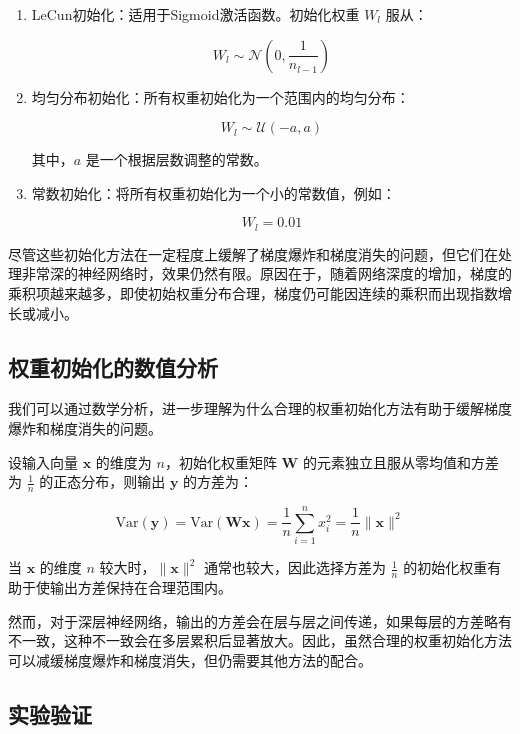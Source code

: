 \begin{enumerate}


  \item LeCun初始化：适用于Sigmoid激活函数。初始化权重 \( W_l \) 服从：

  \[ W_l \sim \mathcal{N}\left(0, \frac{1}{n_{l-1}}\right) \]

  \item 均匀分布初始化：所有权重初始化为一个范围内的均匀分布：

  \[ W_l \sim \mathcal{U}(-a, a) \]

  其中，\( a \) 是一个根据层数调整的常数。

  \item 常数初始化：将所有权重初始化为一个小的常数值，例如：

  \[ W_l = 0.01 \]

\end{enumerate}

尽管这些初始化方法在一定程度上缓解了梯度爆炸和梯度消失的问题，但它们在处理非常深的神经网络时，效果仍然有限。原因在于，随着网络深度的增加，梯度的乘积项越来越多，即使初始权重分布合理，梯度仍可能因连续的乘积而出现指数增长或减小。

\subsection{权重初始化的数值分析}

我们可以通过数学分析，进一步理解为什么合理的权重初始化方法有助于缓解梯度爆炸和梯度消失的问题。

设输入向量 \( \mathbf{x} \) 的维度为 \( n \)，初始化权重矩阵 \( \mathbf{W} \) 的元素独立且服从零均值和方差为 \( \frac{1}{n} \) 的正态分布，则输出 \( \mathbf{y} \) 的方差为：

\[ \text{Var}(\mathbf{y}) = \text{Var}(\mathbf{W}\mathbf{x}) = \frac{1}{n} \sum_{i=1}^n x_i^2 = \frac{1}{n} \|\mathbf{x}\|^2 \]

当 \(\mathbf{x}\) 的维度 \( n \) 较大时，\(\|\mathbf{x}\|^2\) 通常也较大，因此选择方差为 \(\frac{1}{n}\) 的初始化权重有助于使输出方差保持在合理范围内。

然而，对于深层神经网络，输出的方差会在层与层之间传递，如果每层的方差略有不一致，这种不一致会在多层累积后显著放大。因此，虽然合理的权重初始化方法可以减缓梯度爆炸和梯度消失，但仍需要其他方法的配合。

\subsection{实验验证}

